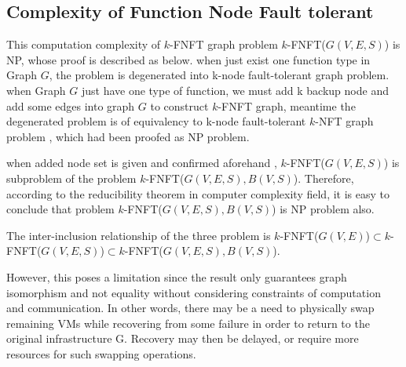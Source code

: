 \subsection{Complexity of Function Node Fault tolerant}
\label{sec:Complexity}
This computation complexity of $k$-FNFT graph problem $k$-FNFT($G(V,E,S)$) is NP, whose proof is described as below. when just exist one function type in Graph $G$, the problem is degenerated into k-node fault-tolerant graph problem. when Graph $G$ just have one type of function, we must add k backup node and add some edges into graph $G$ to construct $k$-FNFT graph, meantime the degenerated problem is of equivalency to k-node fault-tolerant $k$-NFT graph problem , which had been proofed as NP problem\cite{harary1996node}.

when added node set is given and confirmed aforehand , $k$-FNFT($G(V,E,S)$) is subproblem of the problem $k$-FNFT($G(V,E,S),B(V,S)$). Therefore, according to  the  reducibility theorem\cite{cormen2009introduction} in computer complexity field, it is easy to conclude that problem $k$-FNFT($G(V,E,S),B(V,S)$) is NP problem also.

The inter-inclusion relationship of the three problem is $k$-FNFT($G(V,E)$)$\subset$$k$-FNFT($G(V,E,S)$)$\subset$$k$-FNFT($G(V,E,S),B(V,S)$).




However, this poses a limitation since the result only guarantees graph isomorphism and not equality without considering constraints of computation and communication. In other words, there may be a need to physically swap remaining VMs while recovering from some failure in order to return to the original infrastructure G. Recovery may then be delayed, or require more resources for such swapping operations.






